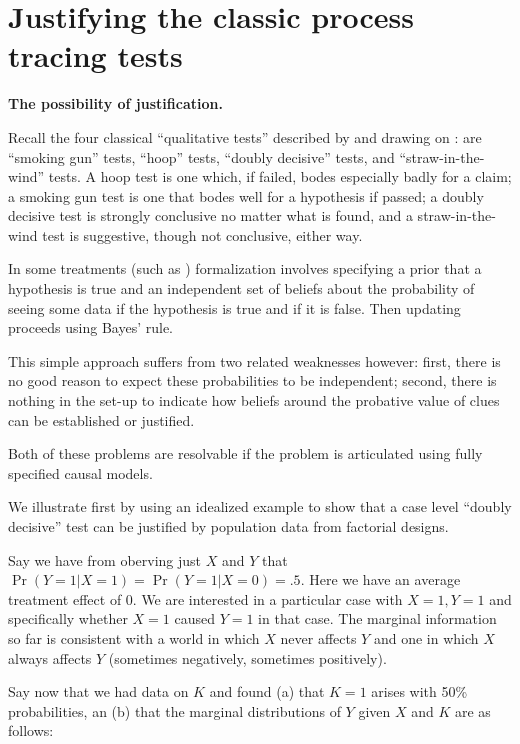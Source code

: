 \documentclass[
  12pt,
]{book}
\begin{document}
\hypertarget{justifying-the-classic-process-tracing-tests}{%
\section{Justifying the classic process tracing tests}\label{justifying-the-classic-process-tracing-tests}}

\textbf{The possibility of justification.}

Recall the four classical ``qualitative tests'' described by \citet{collier2011understanding} and drawing on \citet{Van-Evera:1997} : are ``smoking gun'' tests, ``hoop'' tests, ``doubly decisive'' tests, and ``straw-in-the-wind'' tests. A hoop test is one which, if failed, bodes especially badly for a claim; a smoking gun test is one that bodes well for a hypothesis if passed; a doubly decisive test is strongly conclusive no matter what is found, and a straw-in-the-wind test is suggestive, though not conclusive, either way.

In some treatments (such as \citet{humphreys2015mixing}) formalization involves specifying a prior that a hypothesis is true and an independent set of beliefs about the probability of seeing some data if the hypothesis is true and if it is false. Then updating proceeds using Bayes' rule.

This simple approach suffers from two related weaknesses however: first, there is no good reason to expect these probabilities to be independent; second, there is nothing in the set-up to indicate how beliefs around the probative value of clues can be established or justified.

Both of these problems are resolvable if the problem is articulated using fully specified causal models.

We illustrate first by using an idealized example to show that a case level ``doubly decisive'' test can be justified by population data from factorial designs.

Say we have from oberving just \(X\) and \(Y\) that \(\Pr(Y=1|X=1) = \Pr(Y=1|X=0) = .5\). Here we have an average treatment effect of 0. We are interested in a particular case with \(X=1, Y=1\) and specifically whether \(X=1\) caused \(Y=1\) in that case. The marginal information so far is consistent with a world in which \(X\) never affects \(Y\) and one in which \(X\) always affects \(Y\) (sometimes negatively, sometimes positively).

Say now that we had data on \(K\) and found (a) that \(K=1\) arises with 50\% probabilities, an (b) that the marginal distributions of \(Y\) given \(X\) and \(K\) are as follows:
\end{document}
